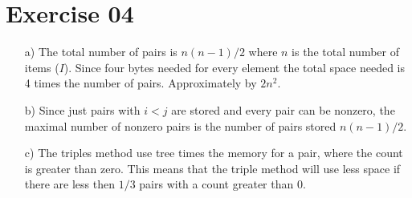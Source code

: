 \documentclass[11pt,a4paper]{scrartcl}
\begin{document}
\section*{Exercise 04}

\begin{itemize}

\item[a)] The total number of pairs is $n(n-1)/2$ where $n$ is the total number of items ($I$). Since four bytes needed for every element the total space needed is 4 times the number of pairs. Approximately by $2n^2$.
\item[b)] Since just pairs with $i < j$ are stored and every pair can be nonzero, the maximal number of nonzero pairs is the number of pairs stored $n(n-1)/2$.
\item[c)] The triples method use tree times the memory for a pair, where the count is greater than zero. This means that the triple method will use less space if there are less then $1 / 3$ pairs with a count greater than $0$.

\end{itemize}
\end{document}
